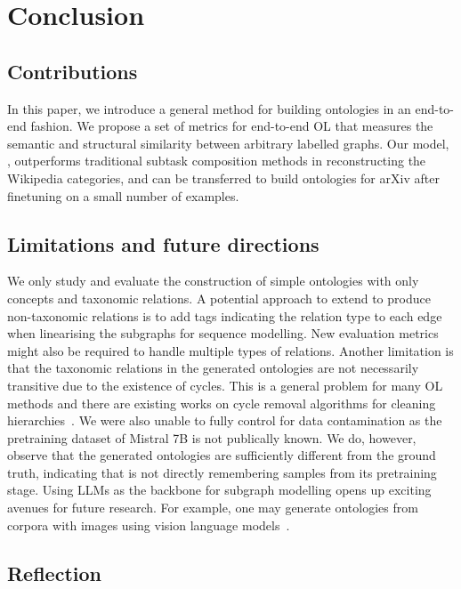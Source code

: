 \chapter{Conclusion}

\section{Contributions}

In this paper, we introduce a general method for building ontologies in an end-to-end fashion. We propose a set of metrics for end-to-end OL that measures the semantic and structural similarity between arbitrary labelled graphs. Our model, \name, outperforms traditional subtask composition methods in reconstructing the Wikipedia categories, and can be transferred to build ontologies for arXiv after finetuning on a small number of examples.

\section{Limitations and future directions}


We only study and evaluate the construction of simple ontologies with only concepts and taxonomic relations. A potential approach to extend \name to produce non-taxonomic relations is to add tags indicating the relation type to each edge when linearising the subgraphs for sequence modelling. New evaluation metrics might also be required to handle multiple types of relations. Another limitation is that the taxonomic relations in the generated ontologies are not necessarily transitive due to the existence of cycles. This is a general problem for many OL methods and there are existing works on cycle removal algorithms for cleaning hierarchies~\cite{sun2017breaking,zesch2007analysis}. We were also unable to fully control for data contamination as the pretraining dataset of Mistral 7B is not publically known. We do, however, observe that the generated ontologies are sufficiently different from the ground truth, indicating that \name is not directly remembering samples from its pretraining stage. Using LLMs as the backbone for subgraph modelling opens up exciting avenues for future research. For example, one may generate ontologies from corpora with images using vision language models~\cite{donahue2015long}.

\section{Reflection}